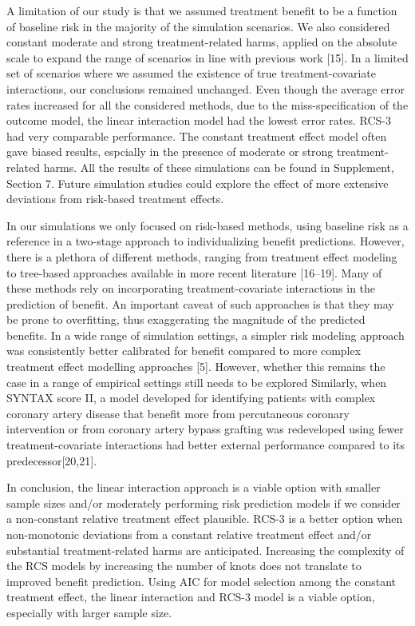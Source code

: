 \documentclass[]{elsarticle} %
\begin{document}
A limitation of our study is that we assumed treatment benefit to be a
function of baseline risk in the majority of the simulation scenarios.
We also considered constant moderate and strong treatment-related harms,
applied on the absolute scale to expand the range of scenarios in line
with previous work {[}15{]}. In a limited set of scenarios where we
assumed the existence of true treatment-covariate interactions, our
conclusions remained unchanged. Even though the average error rates
increased for all the considered methods, due to the miss-specification
of the outcome model, the linear interaction model had the lowest error
rates. RCS-3 had very comparable performance. The constant treatment
effect model often gave biased results, espcially in the presence of
moderate or strong treatment-related harms. All the results of these
simulations can be found in Supplement, Section 7. Future simulation
studies could explore the effect of more extensive deviations from
risk-based treatment effects.

In our simulations we only focused on risk-based methods, using baseline
risk as a reference in a two-stage approach to individualizing benefit
predictions. However, there is a plethora of different methods, ranging
from treatment effect modeling to tree-based approaches available in
more recent literature {[}16--19{]}. Many of these methods rely on
incorporating treatment-covariate interactions in the prediction of
benefit. An important caveat of such approaches is that they may be
prone to overfitting, thus exaggerating the magnitude of the predicted
benefits. In a wide range of simulation settings, a simpler risk
modeling approach was consistently better calibrated for benefit
compared to more complex treatment effect modelling approaches {[}5{]}.
However, whether this remains the case in a range of empirical settings
still needs to be explored Similarly, when SYNTAX score II, a model
developed for identifying patients with complex coronary artery disease
that benefit more from percutaneous coronary intervention or from
coronary artery bypass grafting was redeveloped using fewer
treatment-covariate interactions had better external performance
compared to its predecessor{[}20,21{]}.

In conclusion, the linear interaction approach is a viable option with
smaller sample sizes and/or moderately performing risk prediction models
if we consider a non-constant relative treatment effect plausible. RCS-3
is a better option when non-monotonic deviations from a constant
relative treatment effect and/or substantial treatment-related harms are
anticipated. Increasing the complexity of the RCS models by increasing
the number of knots does not translate to improved benefit prediction.
Using AIC for model selection among the constant treatment effect, the
linear interaction and RCS-3 model is a viable option, especially with
larger sample size.
\end{document}
